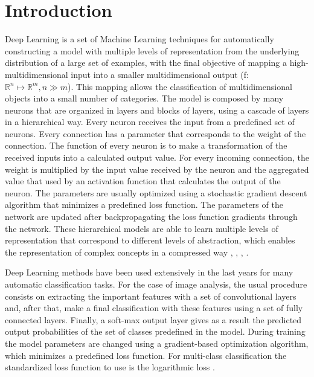 \documentclass[times,twocolumn,final,authoryear]{elsarticle}
\begin{document}

\section{Introduction}

Deep Learning is a set of Machine Learning techniques 
for automatically constructing a model with multiple levels of representation from the underlying distribution of a large set of examples, with the final objective of mapping a high-multidimensional input into a smaller multidimensional output (f: $\mathbb{R}^{n} 
\mapsto \mathbb{R}^{m}, n \gg m$). 
This mapping allows the classification of multidimensional objects into a small number of categories. The model is composed by many neurons that are organized in layers and blocks of layers, using a cascade of layers in a hierarchical way. Every neuron receives the input from a predefined set of neurons. Every connection has a parameter that corresponds to the weight of the connection. 
The function of every neuron is to make a transformation of the received inputs into a calculated output value. For every incoming connection, the weight is multiplied by the input value received by the neuron and the aggregated value that used by an activation function that calculates the output of the neuron. The parameters are usually optimized using a stochastic gradient descent algorithm that minimizes a predefined loss function. The parameters of the network are updated after backpropagating the loss function gradients through the network. These hierarchical models are able to learn multiple levels of representation that correspond to different levels of abstraction, which enables the representation of complex concepts in a compressed way \citep{nature-deep-learning}, \citep{888}, \citep{Bengio:2013:RLR:2498740.2498889}, \citep{bengio-2009}.

Deep Learning methods have been used extensively in the last years for many automatic classification tasks. For the case of image analysis, the usual procedure consists on extracting the important features with a set of convolutional layers and, after that, make a final classification with these features using a set of fully connected layers. Finally, a soft-max output layer gives as a result the predicted output probabilities of the set of classes predefined in the model. During training the model parameters are changed using a gradient-based optimization algorithm, which minimizes a predefined loss function. For multi-class classification the standardized loss function to use is the logarithmic loss \citep{Goodfellow-et-al-2016}.
\end{document}
